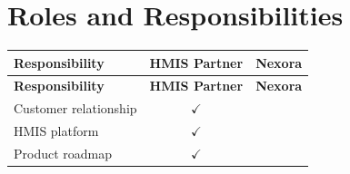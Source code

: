 
\section{Roles and Responsibilities}

\renewcommand{\arraystretch}{1.3}

\begin{longtable}{|p{7cm}|c|c|}

\hline

\rowcolor{Primary!10}

\textbf{Responsibility}

&

\textbf{HMIS Partner}

&

\textbf{Nexora}

\\

\hline

\endfirsthead

\hline

\rowcolor{Primary!10}

\textbf{Responsibility}

&

\textbf{HMIS Partner}

&

\textbf{Nexora}

\\

\hline

\endhead

\hline

\endfoot

\endlastfoot

Customer relationship

&

$\checkmark$

&

\\

\hline

HMIS platform

&

$\checkmark$

&

\\

\hline

Product roadmap

&

$\checkmark$


\end{longtable}
